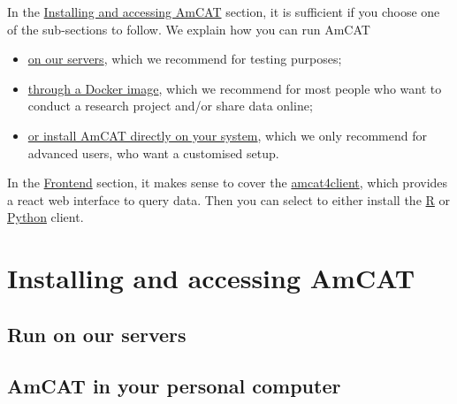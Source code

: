 \documentclass[
  letterpaper,
  DIV=11,
  numbers=noendperiod]{scrreprt}
\providecommand{\tightlist}{%
  \setlength{\itemsep}{0pt}\setlength{\parskip}{0pt}}\usepackage{longtable,booktabs,array}
\begin{document}
In the \hyperref[Installing-and-accessing-AmCAT]{Installing and
accessing AmCAT} section, it is sufficient if you choose one of the
sub-sections to follow. We explain how you can run AmCAT

\begin{itemize}
\tightlist
\item
  \hyperref[run-on-our-servers]{on our servers}, which we recommend for
  testing purposes;
\item
  \hyperref[setup-through-docker]{through a Docker image}, which we
  recommend for most people who want to conduct a research project
  and/or share data online;
\item
  \hyperref[setup-on-your-own-server]{or install AmCAT directly on your
  system}, which we only recommend for advanced users, who want a
  customised setup.
\end{itemize}

In the \hyperref[frontend]{Frontend} section, it makes sense to cover
the \hyperref[amcat4client]{amcat4client}, which provides a react web
interface to query data. Then you can select to either install the
\hyperref[amcat4r]{R} or \hyperref[amcat4py]{Python} client.

\section{Installing and accessing
AmCAT}\label{installing-and-accessing-amcat}

\subsection{Run on our servers}\label{run-on-our-servers}

\begin{tcolorbox}[enhanced jigsaw, coltitle=black, breakable, title=\textcolor{quarto-callout-important-color}{\faExclamation}\hspace{0.5em}{Coming soon\ldots{}}, left=2mm, arc=.35mm, colback=white, colframe=quarto-callout-important-color-frame, toptitle=1mm, opacityback=0, bottomrule=.15mm, rightrule=.15mm, leftrule=.75mm, opacitybacktitle=0.6, bottomtitle=1mm, titlerule=0mm, toprule=.15mm, colbacktitle=quarto-callout-important-color!10!white]

\end{tcolorbox}

\subsection{AmCAT in your personal
computer}\label{amcat-in-your-personal-computer}
\end{document}
